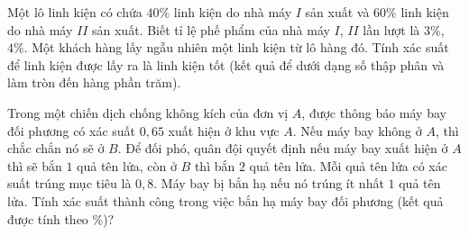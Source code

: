 \begin{bt}%
	Một lô linh kiện có chứa $40\%$ linh kiện do nhà máy $I$ sản xuất và $60\%$ linh kiện do nhà máy $II$ sản xuất. Biết tỉ lệ phế phẩm của nhà máy $I$, $II$ lần lượt là $3\%$, $4\%$. Một khách hàng lấy ngẫu nhiên một linh kiện từ lô hàng đó. Tính xác suất để linh kiện được lấy ra là linh kiện tốt (kết quả để dưới  dạng số thập phân và làm tròn đến hàng phần trăm).
\end{bt}

\begin{bt}%
	Trong một chiến dịch chống không kích của đơn vị $A$, được thông báo máy bay đối phương có xác suất $0{,}65$ xuất hiện ở khu vực $A$. Nếu máy bay không ở $A$, thì chắc chắn nó sẽ ở $B$.  Để đối phó, quân đội quyết định nếu máy bay xuất hiện ở $A$ thì sẽ bắn $1$ quả tên lửa, còn ở $B$ thì bắn $2$ quả tên lửa. Mỗi quả tên lửa có xác suất trúng mục tiêu là $0{,}8$. Máy bay bị bắn hạ nếu nó trúng ít nhất $1$ quả tên lửa. Tính xác suất thành công trong việc bắn hạ máy bay đối phương (kết quả được tính theo \%)?
\end{bt}

